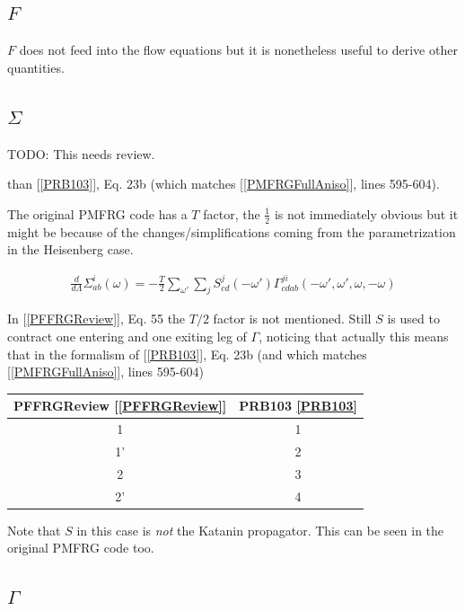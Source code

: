 \documentclass{article}
\begin{document}
\subsection{$F$}

$F$ does not feed into the flow equations but it is nonetheless useful
to derive other quantities.



\subsection{$\Sigma$}

TODO: This needs review.

than [\ref{PRB103}], Eq. 23b (which matches [\ref{PMFRGFullAniso}], lines 595-604).

The original PMFRG code has a $T$ factor, the $\frac{1}{2}$ is not immediately obvious
but it might be because of the changes/simplifications
coming from the parametrization in the Heisenberg case.


\begin{equation}
  \begin{aligned}
    \frac{d}{d\Lambda} \Sigma^{i}_{ab}(\omega) = -\frac{T}{2} \sum_{\omega'} \sum_{j} S^{j}_{cd}(-\omega')\Gamma^{ji}_{cdab}(-\omega',\omega',\omega,-\omega)
  \end{aligned}
\end{equation}

In [\ref{PFFRGReview}], Eq. 55 the $T/2$ factor is not mentioned.
Still $S$ is used to contract one entering and one exiting leg of $\Gamma$,
noticing that actually this means that in the formalism of
[\ref{PRB103}], Eq. 23b (and which matches [\ref{PMFRGFullAniso}], lines 595-604)

\begin{tabular}{|c|c|}
  \hline
  PFFRGReview [\ref{PFFRGReview}]  &  PRB103 \ref{PRB103}\\
  \hline
  1   & 1 \\
  \hline
  1'  & 2 \\
  \hline
  2   & 3 \\
  \hline
  2'  & 4 \\
  \hline
\end{tabular}



Note that $S$ in this case is \emph{not} the Katanin propagator.
This can be seen in the original PMFRG code too.

\subsection{$\Gamma$}
\end{document}
